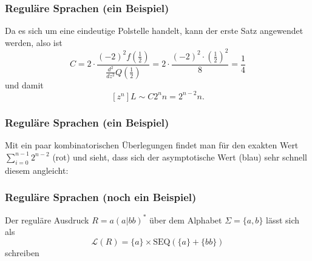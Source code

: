 \documentclass{beamer}
\begin{document}
\begin{frame}\frametitle{Reguläre Sprachen (ein Beispiel)}
  Da es sich um eine eindeutige Polstelle handelt, kann der erste Satz angewendet werden, also ist
  \[
    C = 2 \cdot \frac{(-2)^2 f(\frac{1}{2})}{\frac{d^2}{dz^2} Q(\frac{1}{2})} = 2 \cdot \frac{(-2)^2 \cdot (\frac{1}{2})^2}{8} = \frac{1}{4}
  \]
  und damit
  \[
    [z^n] L \sim C 2^n n = 2^{n - 2} n \text{.}
  \]
\end{frame}

\begin{frame}\frametitle{Reguläre Sprachen (ein Beispiel)}
  Mit ein paar kombinatorischen Überlegungen findet man für den exakten Wert $\sum_{i = 0}^{n - 1} 2^{n - 2}$ (rot) und sieht, dass sich der asymptotische Wert (blau) sehr schnell diesem angleicht: \\
  \begin{center}
  \end{center}
\end{frame}

\begin{frame}\frametitle{Reguläre Sprachen (noch ein Beispiel)}
  Der reguläre Ausdruck $R = a (a|bb)^*$ über dem Alphabet $\Sigma = \{ a, b \}$ lässt sich als
  \[
  	\mathcal{L}(R) = \{ a \} \times \text{SEQ}(\{ a \} + \{ bb \})
  \]
  schreiben 
\end{frame}
\end{document}

